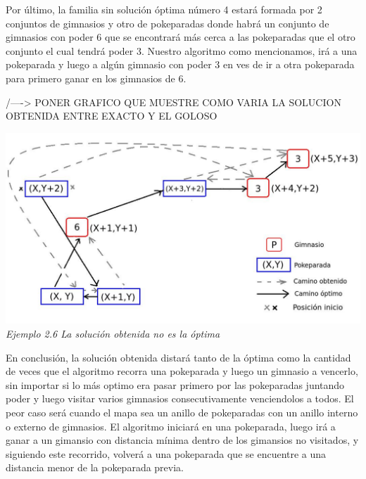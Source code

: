   
  
Por \'ultimo, la familia sin soluci\'on \'optima n\'umero 4 estar\'a formada por 2 conjuntos de gimnasios y otro de pokeparadas donde habr\'a un conjunto de gimnasios con poder 6 que se encontrar\'a m\'as cerca a las pokeparadas que el otro conjunto el cual tendr\'a poder 3. Nuestro algoritmo como mencionamos, ir\'a a una pokeparada y luego a alg\'un gimnasio con poder 3 en ves de ir a otra pokeparada para primero ganar en los gimnasios de 6.

/----> PONER GRAFICO QUE MUESTRE COMO VARIA LA SOLUCION OBTENIDA ENTRE EXACTO Y EL GOLOSO 

\vspace*{0.3cm} \vspace*{0.3cm}
  \begin{center}
\includegraphics[scale=0.60]{./EJ2/nooptima2.jpeg}
\\{\textit{Ejemplo 2.6 La soluci\'on obtenida no es la \'optima}}
  \end{center}
  \vspace*{0.3cm}


En conclusi\'on, la soluci\'on obtenida distará tanto de la óptima como la cantidad de veces que el algoritmo recorra una pokeparada y luego un gimnasio a vencerlo, sin importar si lo más optimo era pasar primero por las pokeparadas juntando poder y luego visitar varios gimnasios consecutivamente venciendolos a todos.
El peor caso será cuando el mapa sea un anillo de pokeparadas con un anillo interno o externo de gimnasios. 
El algoritmo iniciará en una pokeparada, luego irá a ganar a un gimansio con distancia mínima dentro de los gimansios no visitados, y siguiendo este recorrido, volverá a una pokeparada que se encuentre a una distancia menor de la pokeparada previa.\\



